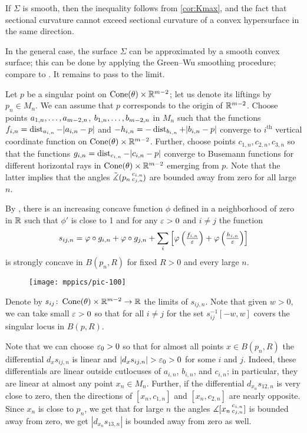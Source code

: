  If $\Sigma$ is smooth, then the inequality follows from \ref{cor:Kmax}, and the fact that sectional curvature  cannot exceed sectional curvature of a convex hypersurface in the same direction.

In the general case, the surface $\Sigma$ can be approximated by a smooth convex surface;
this can be done by applying the Green--Wu smoothing procedure; compare to \cite{AKP-buyalo}.
It remains to pass to the limit.
\qeds

Let $p$ be a singular point on $\operatorname{Cone}(\theta)\times \mathbb{R}^{m-2}$;
let us denote its liftings by $p_n\in M_n$.
We can assume that $p$ corresponds to the origin of $\mathbb{R}^{m-2}$.
Choose points $a_{1,n},\zz\dots,a_{m-2,n}$, $b_{1,n},\zz\dots,b_{m-2,n}$ in $M_n$ such that the functions $f_{i,n}=\operatorname{\rm dist}_{a_{i,n}}-|a_{i,n}-p|$ and $-h_{i,n}=-\operatorname{\rm dist}_{b_{i,n}}+|b_{i,n}-p|$ converge to $i^{\text{th}}$ vertical coordinate function on $\operatorname{Cone}(\theta)\times \mathbb{R}^{m-2}$.
Further, choose points $c_{1,n},c_{2,n},c_{3,n}$ so that the functions $g_{i,n}=\operatorname{\rm dist}_{c_{i,n}}-|c_{i,n}-p|$ converge to Busemann functions for different horizontal rays in $\operatorname{Cone}(\theta)\times \mathbb{R}^{m-2}$ emerging from $p$.
Note that the latter implies that the angles $\tilde\measuredangle(p_n\,{}^{c_{i,n}}_{c_{j,n}}\hspace{-0.2ex})$ are bounded away from zero for all large~$n$.

By \cite[Lemma 7.2.1]{petrunin-conc}, there is an increasing concave function $\phi$ defined in a neighborhood of zero in $\mathbb{R}$ such that $\phi'$ is close to 1 and for any $\varepsilon>0$ and $i\ne j$ the function 
\[s_{ij,n}
=
\varphi\circ g_{i,n}
+
\varphi\circ g_{j,n}
+
\sum_i\left[\varphi\left(\tfrac{f_{i,n}}{\varepsilon}\right)+\varphi\left(\tfrac{h_{i,n}}{\varepsilon}\right)\right]\]
is strongly concave in $B(p_n,R)$ for fixed $R>0$ and every large $n$.

\begin{wrapfigure}{r}{35 mm}
\vskip-0mm
\centering
\texttt{[image: mppics/pic-100]}
\vskip0mm
\end{wrapfigure}

Denote by $s_{ij}\:\Cone(\theta)\zz\times \RR^{m-2}\to \RR$ the limits of $s_{ij,n}$.
Note that given $w>0$, we can take small $\varepsilon>0$ so that for all $i\ne j$ for the set $s_{ij}^{-1}[-w,w]$ covers the singular locus in $B(p,R)$. 

Note that we can choose $\varepsilon_0>0$ so that for almost all points $x\in B(p_n,R)$ 
the differential $d_xs_{ij,n}$ is linear and $|d_xs_{ij,n}|>\eps_0>0$ for some $i$ and $j$.
Indeed, these differentials are linear outside cutlocuses of $a_{i,n}$, $b_{i,n}$, and $c_{i,n}$;
in particular, they are linear at almost any point $x_n\in M_n$.
Further, if the differential $d_{x_n}s_{12,n}$ is very close to zero,
then the directions of $[x_n,c_{1,n}]$ and $[x_n,c_{2,n}]$ are nearly opposite.
Since $x_n$ is close to $p_n$, we get that for large $n$ the angles $\measuredangle[x_n\,{}^{c_{i,n}}_{c_{j,n}}]$ is bounded away from zero, we get $|d_{x_n}s_{13,n}|$ is bounded away from zero as well.

